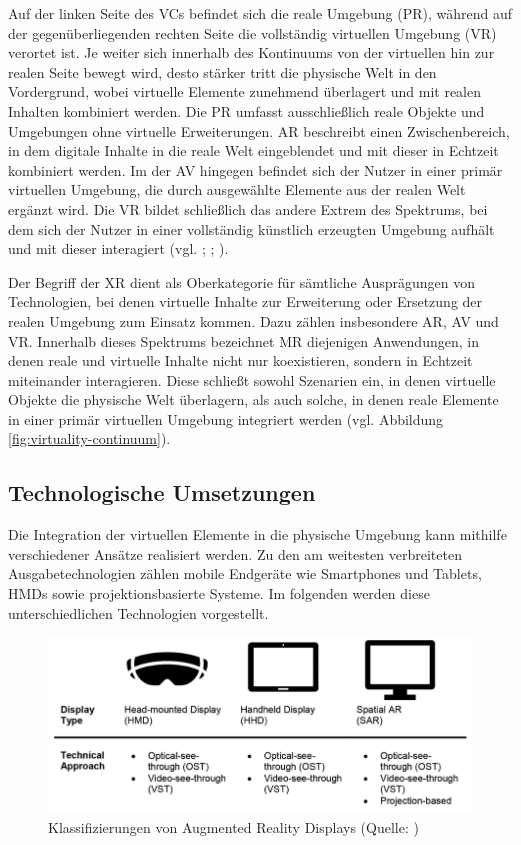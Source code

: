 Auf der linken Seite des \ac{VC}s befindet sich die reale Umgebung (\ac{PR}), während auf der gegenüberliegenden rechten Seite die vollständig virtuellen Umgebung (\ac{VR}) verortet ist. Je weiter sich innerhalb des Kontinuums von der virtuellen hin zur realen Seite bewegt wird, desto stärker tritt die physische Welt in den Vordergrund, wobei virtuelle Elemente zunehmend überlagert und mit realen Inhalten kombiniert werden. 
Die \ac{PR} umfasst ausschließlich reale Objekte und Umgebungen ohne virtuelle Erweiterungen. \ac{AR} beschreibt einen Zwischenbereich, in dem digitale Inhalte in die reale Welt eingeblendet und mit dieser in Echtzeit kombiniert werden. Im der \ac{AV} hingegen befindet sich der Nutzer in einer primär virtuellen Umgebung, die durch ausgewählte Elemente aus der realen Welt ergänzt wird. Die \ac{VR} bildet schließlich das andere Extrem des Spektrums, bei dem sich der Nutzer in einer vollständig künstlich erzeugten Umgebung aufhält und mit dieser interagiert (vgl. \citealp[S. 3]{milgram_taxonomy_1994}; \citealp[S. 8f]{knoll_augmented_2022}; \citealp[S. 3]{zuniga_gonzalez_making_2021}).

Der Begriff der \ac{XR} dient als Oberkategorie für sämtliche Ausprägungen von Technologien, bei denen virtuelle Inhalte zur Erweiterung oder Ersetzung der realen Umgebung zum Einsatz kommen. Dazu zählen insbesondere \ac{AR}, \ac{AV} und \ac{VR}. Innerhalb dieses Spektrums bezeichnet \ac{MR} diejenigen Anwendungen, in denen reale und virtuelle Inhalte nicht nur koexistieren, sondern in Echtzeit miteinander interagieren. Diese schließt sowohl Szenarien ein, in denen virtuelle Objekte die physische Welt überlagern, als auch solche, in denen reale Elemente in einer primär virtuellen Umgebung integriert werden (vgl. Abbildung \ref{fig:virtuality-continuum}).

\subsection{Technologische Umsetzungen}
Die Integration der virtuellen Elemente in die physische Umgebung kann mithilfe verschiedener Ansätze realisiert werden. Zu den am weitesten verbreiteten Ausgabetechnologien zählen mobile Endgeräte wie Smartphones und Tablets, \ac{HMD}s sowie projektionsbasierte Systeme. Im folgenden werden diese unterschiedlichen Technologien vorgestellt.
\begin{figure}[ht]
\centering
\includegraphics[width=1\linewidth]{content/pictures/devices.PNG}
\caption{Klassifizierungen von Augmented Reality Displays (Quelle: \citealp[S. 315]{leins_comparing_2024})}
\label{fig:ar-classes}
\end{figure}

